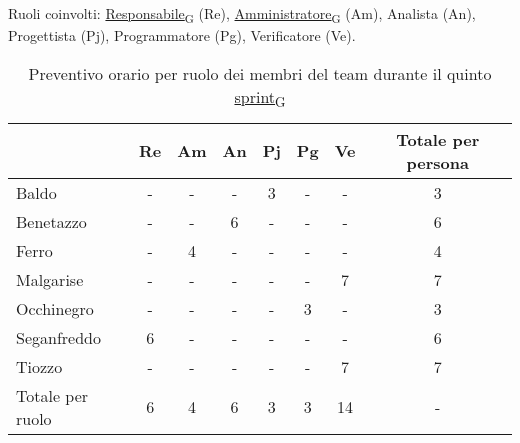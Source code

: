 Ruoli coinvolti: \href{https://7last.github.io/docs/rtb/documentazione-interna/glossario\#responsabile}{Responsabile\textsubscript{G}} (Re), \href{https://7last.github.io/docs/rtb/documentazione-interna/glossario\#amministratore}{Amministratore\textsubscript{G}} (Am), Analista (An), Progettista (Pj), Programmatore (Pg), Verificatore (Ve).
\begin{table}[!h]
    \centering
    \begin{tabular}{ | l | c | c | c | c | c | c | c | }
        \hline
        \textbf{} & \textbf{Re} & \textbf{Am} &\textbf{An} & \textbf{Pj} & \textbf{Pg} & \textbf{Ve} & \textbf{Totale per persona} \\
        \hline
        Baldo            &  -   &  -   &  -   &  3   &  -   &  -   &  3   \\
        Benetazzo        &  -   &  -   &  6   &  -   &  -   &  -   &  6   \\
        Ferro            &  -   &  4   &  -   &  -   &  -   &  -   &  4   \\
        Malgarise        &  -   &  -   &  -   &  -   &  -   &  7   &  7   \\
        Occhinegro       &  -   &  -   &  -   &  -   &  3   &  -   &  3   \\
        Seganfreddo      &  6   &  -   &  -   &  -   &  -   &  -   &  6   \\
        Tiozzo           &  -   &  -   &  -   &  -   &  -   &  7   &  7   \\
        \hline
        Totale per ruolo &  6   &  4   &  6   &  3   &  3   &  14  &  -   \\
        \hline
    \end{tabular}
    \caption{Preventivo orario per ruolo dei membri del team durante il quinto \href{https://7last.github.io/docs/rtb/documentazione-interna/glossario\#sprint}{sprint\textsubscript{G}}} 
\end{table}

